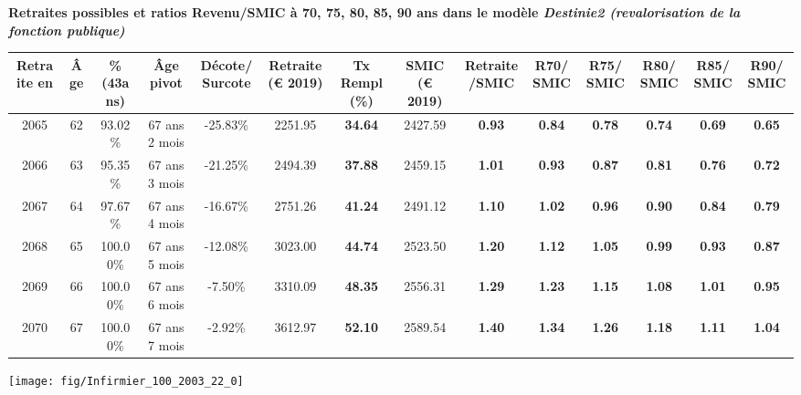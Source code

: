  \vspace{0.1cm} 
{\bf \noindent Retraites possibles et ratios Revenu/SMIC à 70, 75, 80, 85, 90 ans dans le modèle \emph{Destinie2 (revalorisation de la fonction publique)}}  
 
\begin{adjustbox}{max width=\textwidth} 
\begin{tabular}[htb]{|c|c||c|c|c||c|c||c|c||c|c|c|c|c|} 
\hline 
 Retraite en &  Âge &  \%(43ans) &  Âge pivot &  Décote/Surcote &  Retraite (\euro{} 2019) &  Tx Rempl(\%) &  SMIC (\euro{} 2019) &  Retraite/SMIC &  R70/SMIC &  R75/SMIC &  R80/SMIC &  R85/SMIC &  R90/SMIC \\ 
\hline \hline 
 2065 &  62 &  93.02\% &  67 ans 2 mois &  -25.83\% &  2251.95 &  {\bf 34.64} &  2427.59 &  {\bf {\color{red} 0.93}} &  {\bf {\color{red} 0.84}} &  {\bf {\color{red} 0.78}} &  {\bf {\color{red} 0.74}} &  {\bf {\color{red} 0.69}} &  {\bf {\color{red} 0.65}} \\ 
\hline 
 2066 &  63 &  95.35\% &  67 ans 3 mois &  -21.25\% &  2494.39 &  {\bf 37.88} &  2459.15 &  {\bf 1.01} &  {\bf {\color{red} 0.93}} &  {\bf {\color{red} 0.87}} &  {\bf {\color{red} 0.81}} &  {\bf {\color{red} 0.76}} &  {\bf {\color{red} 0.72}} \\ 
\hline 
 2067 &  64 &  97.67\% &  67 ans 4 mois &  -16.67\% &  2751.26 &  {\bf 41.24} &  2491.12 &  {\bf 1.10} &  {\bf 1.02} &  {\bf {\color{red} 0.96}} &  {\bf {\color{red} 0.90}} &  {\bf {\color{red} 0.84}} &  {\bf {\color{red} 0.79}} \\ 
\hline 
 2068 &  65 &  100.00\% &  67 ans 5 mois &  -12.08\% &  3023.00 &  {\bf 44.74} &  2523.50 &  {\bf 1.20} &  {\bf 1.12} &  {\bf 1.05} &  {\bf {\color{red} 0.99}} &  {\bf {\color{red} 0.93}} &  {\bf {\color{red} 0.87}} \\ 
\hline 
 2069 &  66 &  100.00\% &  67 ans 6 mois &  -7.50\% &  3310.09 &  {\bf 48.35} &  2556.31 &  {\bf 1.29} &  {\bf 1.23} &  {\bf 1.15} &  {\bf 1.08} &  {\bf 1.01} &  {\bf {\color{red} 0.95}} \\ 
\hline 
 2070 &  67 &  100.00\% &  67 ans 7 mois &  -2.92\% &  3612.97 &  {\bf 52.10} &  2589.54 &  {\bf 1.40} &  {\bf 1.34} &  {\bf 1.26} &  {\bf 1.18} &  {\bf 1.11} &  {\bf 1.04} \\ 
\hline 
\hline 
\end{tabular} 
\end{adjustbox} 
 
 \vspace{0.1cm} 

 {\hspace{-2.2cm}\texttt{[image: fig/Infirmier\_100\_2003\_22\_0]}} 


